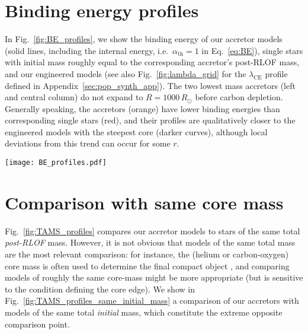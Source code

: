 \documentclass[twocolumn,twocolappendix,trackchanges]{aastex63}
\DeclareRobustCommand{\Eqref}[1]{Eq.~\ref{#1}}
\DeclareRobustCommand{\Figref}[1]{Fig.~\ref{#1}}
\begin{document}
\section{Binding energy profiles}
\label{sec:BE}

In \Figref{fig:BE_profiles}, we show the binding energy of our
accretor models (solid lines,
including the internal energy, i.e.\ $\alpha_\mathrm{th}=1$ in
\Eqref{eq:BE}),
single stars with initial mass roughly equal
to the corresponding accretor's post-RLOF mass, and our engineered models (see also
\Figref{fig:lambda_grid} for the $\lambda_\mathrm{CE}$ profile defined in Appendix~\ref{sec:pop_synth_app}). The two
lowest mass accretors (left and central column) do not expand to
$R=1000\, R_\odot$ before carbon depletion. Generally speaking, the
accretors (orange) have lower binding energies than corresponding
single stars (red), and their profiles are qualitatively closer to the
engineered models with the steepest core (darker curves), although
local deviations from this trend can occur for some $r$.

\begin{figure*}[hbtp]
  \texttt{[image: BE\_profiles.pdf]}
  \caption{Binding energy profile at fixed photospheric radius $R$
    (right y-axis) as a function of radial coordinate $r$. We only show
    profiles with $\alpha_\mathrm{th}=1$, that is accounting for the
    internal energy content of the star. Orange, red, and other colors
    show respectively the accretor models, single stars of same
    post-RLOF total mass, and engineered models with varying CEB
    steepness. Titles indicates the pre-RLOF and approximate post-RLOF
    accretor masses. The vertical colored lines mark the outer edge of
    the helium cores of the accretor and single star, that is the
    outermost location where $Y>0.1$ and $X<0.01$ (solid lines), or
    $X<0.1$ (dashed), or $X<0.2$ (dot-dashed). The
    \textcolor{green!80!black}{\bf dotted} gray lines mark
    the total radius $R$ of these models.}
  \label{fig:BE_profiles}
\end{figure*}


\newpage
\section{Comparison with same core mass}
\label{sec:same_core}

\Figref{fig:TAMS_profiles} compares our accretor models to stars of
the same total \emph{post-RLOF} mass. However, it is not obvious that models
of the same total mass are the most relevant comparison: for instance,
the (helium or carbon-oxygen) core mass is often used to determine the
final compact object \citep[e.g.,][]{fryer:2012, farmer:2019,
  patton:2021, renzo:2022, fryer:2022}, and comparing models of
roughly the same core-mass might be more appropriate (but is sensitive
to the condition defining the core edge). We show in
\Figref{fig:TAMS_profiles_same_initial_mass} a comparison of our
accretors with models of the same total \emph{initial} mass, which
constitute the extreme opposite comparison point.
\end{document}
